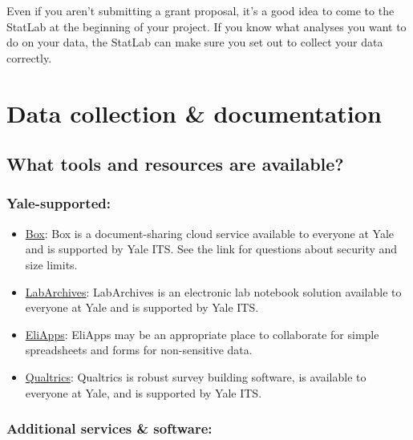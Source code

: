 \documentclass[]{article}
\begin{document}
Even if you aren't submitting a grant proposal, it's a good idea to come
to the StatLab at the beginning of your project. If you know what
analyses you want to do on your data, the StatLab can make sure you set
out to collect your data correctly.

\section{Data collection \&
documentation}\label{data-collection-documentation}

\subsection{What tools and resources are
available?}\label{what-tools-and-resources-are-available-1}

\subsubsection{Yale-supported:}\label{yale-supported}

\begin{itemize}
\item
  \href{http://its.yale.edu/services/collaboration-and-file-sharing/box-yale}{Box}:
  Box is a document-sharing cloud service available to everyone at Yale
  and is supported by Yale ITS. See the link for questions about
  security and size limits.
\item
  \href{http://its.yale.edu/services/research-technologies/elab-notebook/labarchives-faqs}{LabArchives}:
  LabArchives is an electronic lab notebook solution available to
  everyone at Yale and is supported by Yale ITS.
\item
  \href{http://its.yale.edu/services/email-and-calendars/eliapps-google-apps-education}{EliApps}:
  EliApps may be an appropriate place to collaborate for simple
  spreadsheets and forms for non-sensitive data.
\item
  \href{http://its.yale.edu/services/web-and-application-services/qualtrics-survey-tool}{Qualtrics}:
  Qualtrics is robust survey building software, is available to everyone
  at Yale, and is supported by Yale ITS.
\end{itemize}

\subsubsection{Additional services \&
software:}\label{additional-services-software}
\end{document}
